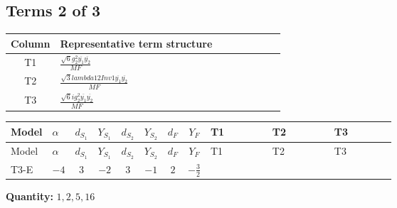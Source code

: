 \documentclass[8pt]{article}
\begin{document}
\begin{landscape}
\subsection*{Terms 2 of 3}
\begin{center}
\begin{tabular}{@{}c >{\raggedright\arraybackslash}p{0.82\linewidth}@{}}
\toprule
Column & Representative term structure \\
\midrule
T1 & \(\displaystyle \frac{\sqrt{6} g_{2}^{2} \overline{y_{1}} \overline{y_{2}}}{MF}\) \\
\midrule
T2 & \(\displaystyle \frac{\sqrt{3} lambda12Inv1 \overline{y_{1}} \overline{y_{2}}}{MF}\) \\
\midrule
T3 & \(\displaystyle \frac{\sqrt{6} i g_{2}^{2} \overline{y_{1}} \overline{y_{2}}}{MF}\) \\
\midrule
\bottomrule
\end{tabular}
\end{center}
\smallskip
\tiny
\begin{longtable}{@{}llcccccc >{\raggedright\arraybackslash}p{0.21\linewidth} >{\raggedright\arraybackslash}p{0.21\linewidth} >{\raggedright\arraybackslash}p{0.21\linewidth}@{}}
\toprule
Model & $\alpha$ & $d_{S_1}$ & $Y_{S_1}$ & $d_{S_2}$ & $Y_{S_2}$ & $d_F$ & $Y_F$ & T1 & T2 & T3 \\
\midrule
\endfirsthead
\toprule
Model & $\alpha$ & $d_{S_1}$ & $Y_{S_1}$ & $d_{S_2}$ & $Y_{S_2}$ & $d_F$ & $Y_F$ & T1 & T2 & T3 \\
\midrule
\endhead
T3-E & $-4$ & $3$ & $-2$ & $3$ & $-1$ & $2$ & $-\frac{3}{2}$ & \scriptsize\adjustbox{max width=\linewidth}{$\begin{gathered} - \frac{\sqrt{6} g_{2}^{2} \overline{y_{1}} \overline{y_{2}}}{6 MF}\end{gathered}$} & \scriptsize\adjustbox{max width=\linewidth}{$\begin{gathered} \frac{\sqrt{3} lambda12Inv1 \overline{y_{1}} \overline{y_{2}}}{6 MF}\end{gathered}$} & \scriptsize\adjustbox{max width=\linewidth}{$\begin{gathered} - \frac{\sqrt{6} i g_{2}^{2} \overline{y_{1}} \overline{y_{2}}}{6 MF}\end{gathered}$} \\
\midrule
\bottomrule
\end{longtable}
\clearpage
\noindent\textbf{Quantity: }$\mathrm{1,2,5,16}$\par\smallskip

\end{landscape}
\end{document}
